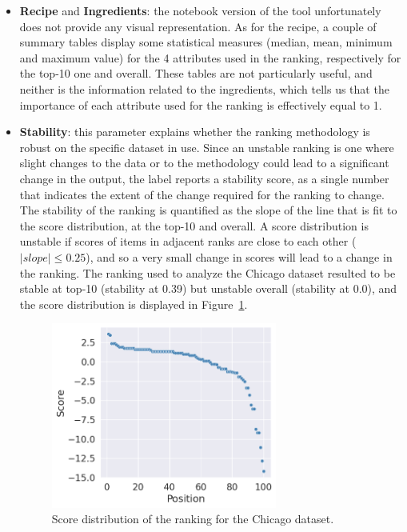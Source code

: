 \begin{itemize}
\item \textbf{Recipe} and \textbf{Ingredients}: the notebook version of the tool unfortunately does not provide any visual representation. As for the recipe, a couple of summary tables display some statistical measures (median, mean, minimum and maximum value) for the 4 attributes used in the ranking, respectively for the top-10 one and overall. These tables are not particularly useful, and neither is the information related to the ingredients, which tells us that the importance of each attribute used for the ranking is effectively equal to 1.
\item \textbf{Stability}: this parameter explains whether the ranking methodology is robust on the specific dataset in use. Since an unstable ranking is one where slight changes to the data or to the methodology could lead to a significant change in the output, the label reports a stability score, as a single number that indicates the extent of the change required for the ranking to change. The stability of the ranking is quantified as the slope of the line that is fit to the score distribution, at the top-10 and overall. A score distribution is unstable if scores of items in adjacent ranks are close to each other (\(|\mathit{slope}| \leq 0.25\)), and so a very small change in scores will lead to a change in the ranking. The ranking used to analyze the Chicago dataset resulted to be stable at top-10 (stability at 0.39) but unstable overall (stability at 0.0), and the score distribution is displayed in Figure~\ref{fig:chicago_rankingfacts2}.

\begin{figure}[t!]
\centering
\includegraphics[width=0.7\textwidth]{figures/chicago_rankingfacts2.png}
\caption{Score distribution of the ranking for the Chicago dataset.}
\label{fig:chicago_rankingfacts2}
\end{figure}


\end{itemize}
